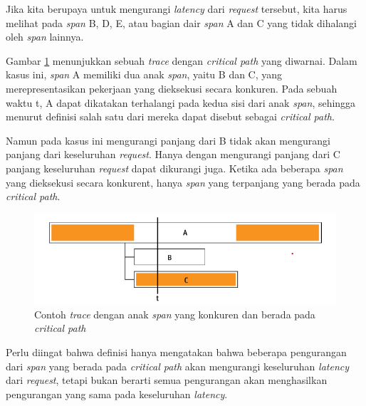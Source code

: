 Jika kita berupaya untuk mengurangi \textit{latency} dari \textit{request} tersebut, kita harus melihat pada \textit{span} B, D, E, atau bagian dair \textit{span} A dan C yang tidak dihalangi oleh \textit{span} lainnya. 

Gambar \ref{ch2-cp-3} menunjukkan sebuah \textit{trace} dengan \textit{critical path} yang diwarnai. Dalam kasus ini, \textit{span} A memiliki dua anak \textit{span}, yaitu B dan C, yang merepresentasikan pekerjaan yang dieksekusi secara konkuren. Pada sebuah waktu t, A dapat dikatakan terhalangi pada kedua sisi dari anak \textit{span}, sehingga menurut definisi salah satu dari mereka dapat disebut sebagai \textit{critical path}.

Namun pada kasus ini mengurangi panjang dari B tidak akan mengurangi panjang dari keseluruhan \textit{request}. Hanya dengan mengurangi panjang dari C panjang keseluruhan \textit{request} dapat dikurangi juga. Ketika ada beberapa \textit{span} yang dieksekusi secara konkurent, hanya \textit{span} yang terpanjang yang berada pada \textit{critical path}.
\begin{figure}[htb]
	\centering
	\includegraphics[width=1\textwidth]{resources/ch2/cp-3.png}
	\caption{Contoh \textit{trace} dengan anak \textit{span} yang konkuren dan berada pada \textit{critical path} \citep{parker2020distributed}}
	\label{ch2-cp-3}
\end{figure}

Perlu diingat bahwa definisi hanya mengatakan bahwa beberapa pengurangan dari \textit{span} yang berada pada \textit{critical path} akan mengurangi keseluruhan \textit{latency} dari \textit{request}, tetapi bukan berarti semua pengurangan akan menghasilkan pengurangan yang sama pada keseluruhan \textit{latency}.

